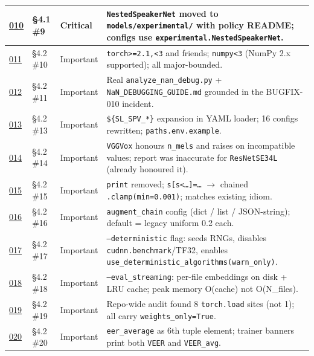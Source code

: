 \documentclass[10pt,a4paper]{article}
\begin{document}
\begin{center}
\begin{tabularx}{\textwidth}{|Y|Y|Y|Y|}
\hline
\href{docs/bugfixes/BUGFIX-010-quarantine-nestedspeakernet.md}{010} & §4.1 \#9 & Critical & \texttt{NestedSpeakerNet} moved to \texttt{models/experimental/} with policy README; configs use \texttt{experimental.NestedSpeakerNet}. \\
\hline
\href{docs/bugfixes/BUGFIX-011-requirements-pins.md}{011} & §4.2 \#10 & Important & \texttt{torch>=2.1,<3} and friends; \texttt{numpy<3} (NumPy 2.x supported); all major-bounded. \\
\hline
\href{docs/bugfixes/BUGFIX-012-fill-nan-debug-placeholders.md}{012} & §4.2 \#11 & Important & Real \texttt{analyze\_nan\_debug.py} + \texttt{NaN\_DEBUGGING\_GUIDE.md} grounded in the BUGFIX-010 incident. \\
\hline
\href{docs/bugfixes/BUGFIX-013-portable-config-paths.md}{013} & §4.2 \#13 & Important & \texttt{\$\{SL\_SPV\_*\}} expansion in YAML loader; 16 configs rewritten; \texttt{paths.env.example}. \\
\hline
\href{docs/bugfixes/BUGFIX-014-honour-n-mels-in-vggvox.md}{014} & §4.2 \#14 & Important & \texttt{VGGVox} honours \texttt{n\_mels} and raises on incompatible values; report was inaccurate for \texttt{ResNetSE34L} (already honoured it). \\
\hline
\href{docs/bugfixes/BUGFIX-015-rawnet3-debug-print-and-inplace.md}{015} & §4.2 \#15 & Important & \texttt{print} removed; \texttt{s[s<…]=…} $\rightarrow$ chained \texttt{.clamp(min=0.001)}; matches existing idiom. \\
\hline
\href{docs/bugfixes/BUGFIX-016-configurable-augment-chain.md}{016} & §4.2 \#16 & Important & \texttt{augment\_chain} config (dict / list / JSON-string); default = legacy uniform 0.2 each. \\
\hline
\href{docs/bugfixes/BUGFIX-017-deterministic-mode-toggle.md}{017} & §4.2 \#17 & Important & \texttt{--deterministic} flag: seeds RNGs, disables \texttt{cudnn.benchmark}/TF32, enables \texttt{use\_deterministic\_algorithms(warn\_only)}. \\
\hline
\href{docs/bugfixes/BUGFIX-018-streaming-evaluation.md}{018} & §4.2 \#18 & Important & \texttt{--eval\_streaming}: per-file embeddings on disk + LRU cache; peak memory O(cache) not O(N\_files). \\
\hline
\href{docs/bugfixes/BUGFIX-019-torch-load-weights-only.md}{019} & §4.2 \#19 & Important & Repo-wide audit found 8 \texttt{torch.load} sites (not 1); all carry \texttt{weights\_only=True}. \\
\hline
\href{docs/bugfixes/BUGFIX-020-eer-definition-disclosure.md}{020} & §4.2 \#20 & Important & \texttt{eer\_average} as 6th tuple element; trainer banners print both \texttt{VEER} and \texttt{VEER\_avg}. \\

\end{tabularx}
\end{center}
\end{document}
